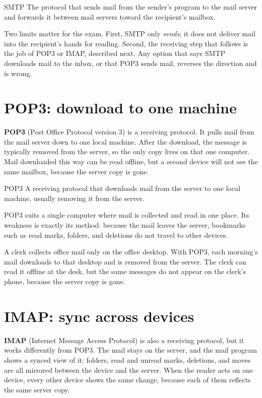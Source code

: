\begin{definitionbox}{SMTP}
The protocol that sends mail from the sender's program to the mail server
and forwards it between mail servers toward the recipient's mailbox.
\end{definitionbox}

Two limits matter for the exam. First, SMTP only \emph{sends}; it does not
deliver mail into the recipient's hands for reading. Second, the receiving
step that follows is the job of POP3 or IMAP, described next. Any option
that says SMTP downloads mail to the inbox, or that POP3 sends mail,
reverses the direction and is wrong.

\section{POP3: download to one machine}
\textbf{POP3} (Post Office Protocol version 3) is a receiving protocol.
It pulls mail from the mail server down to one local machine. After the
download, the message is typically removed from the server, so the only
copy lives on that one computer. Mail downloaded this way can be read
offline, but a second device will not see the same mailbox, because the
server copy is gone.

\begin{definitionbox}{POP3}
A receiving protocol that downloads mail from the server to one local
machine, usually removing it from the server.
\end{definitionbox}

POP3 suits a single computer where mail is collected and read in one place.
Its weakness is exactly its method: because the mail leaves the server,
bookmarks such as read marks, folders, and deletions do not travel to other
devices.

\begin{example}
A clerk collects office mail only on the office desktop. With POP3, each
morning's mail downloads to that desktop and is removed from the server.
The clerk can read it offline at the desk, but the same messages do not
appear on the clerk's phone, because the server copy is gone.
\end{example}

\section{IMAP: sync across devices}
\textbf{IMAP} (Internet Message Access Protocol) is also a receiving
protocol, but it works differently from POP3. The mail stays on the
server, and the mail program shows a synced view of it: folders, read and
unread marks, deletions, and moves are all mirrored between the device and
the server. When the reader acts on one device, every other device shows
the same change, because each of them reflects the same server copy.

